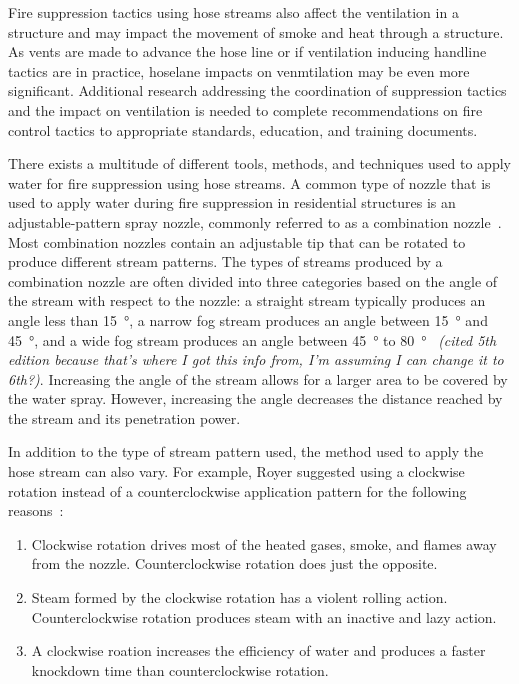 \documentclass[12pt,oneside]{book}
\begin{document}
Fire suppression tactics using hose streams also affect the ventilation in a structure and may impact the movement of smoke and heat through a structure.  As vents are made to advance the hose line or if ventilation inducing handline tactics are in practice, hoselane impacts on venmtilation may be even more significant. Additional research addressing the coordination of suppression tactics and the impact on ventilation is needed to complete recommendations on fire control tactics to appropriate standards, education, and training documents.

There exists a multitude of different tools, methods, and techniques used to apply water for fire suppression using hose streams. A common type of nozzle that is used to apply water during fire suppression in residential structures is an adjustable-pattern spray nozzle, commonly referred to as a combination nozzle~\cite{NFPA1964}. Most combination nozzles contain an adjustable tip that can be rotated to produce different stream patterns. The types of streams produced by a combination nozzle are often divided into three categories based on the angle of the stream with respect to the nozzle: a straight stream typically produces an angle less than 15\SI{}{\degree}, a narrow fog stream produces an angle between 15\SI{}{\degree} and 45\SI{}{\degree}, and a wide fog stream produces an angle between 45\SI{}{\degree} to 80\SI{}{\degree}~\cite{IFSTA:Essentials_of_FF} \textit{(cited 5th edition because that's where I got this info from, I'm assuming I can change it to 6th?)}. Increasing the angle of the stream allows for a larger area to be covered by the water spray.  However, increasing the angle decreases the distance reached by the stream and its penetration power. 

In addition to the type of stream pattern used, the method used to apply the hose stream can also vary. For example, Royer suggested using a clockwise rotation instead of a counterclockwise application pattern for the following reasons~\cite{Royer:ISU}:
\begin{enumerate} 
	\item Clockwise rotation drives most of the heated gases, smoke, and flames away from the nozzle. Counterclockwise rotation does just the opposite.
	\item Steam formed by the clockwise rotation has a violent rolling action. Counterclockwise rotation produces steam with an inactive and lazy action.
	\item A clockwise roation increases the efficiency of water and produces a faster knockdown time than counterclockwise rotation.
\end{enumerate}
\end{document}
